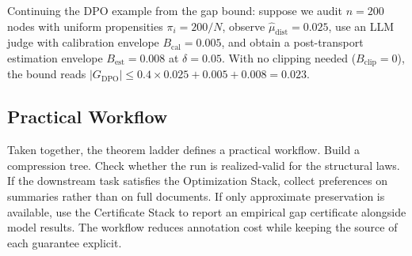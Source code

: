 Continuing the DPO example from the gap bound: suppose we audit $n = 200$ nodes with uniform propensities $\pi_i = 200/N$, observe $\hat{\mu}_{\mathrm{dist}} = 0.025$, use an LLM judge with calibration envelope $B_{\mathrm{cal}} = 0.005$, and obtain a post-transport estimation envelope $B_{\mathrm{est}} = 0.008$ at $\delta = 0.05$. With no clipping needed ($B_{\mathrm{clip}} = 0$), the bound reads $|G_{\mathrm{DPO}}| \le 0.4 \times 0.025 + 0.005 + 0.008 = 0.023$.

\subsection{Practical Workflow}

Taken together, the theorem ladder defines a practical workflow. Build a compression tree. Check whether the run is realized-valid for the structural laws. If the downstream task satisfies the Optimization Stack, collect preferences on summaries rather than on full documents. If only approximate preservation is available, use the Certificate Stack to report an empirical gap certificate alongside model results. The workflow reduces annotation cost while keeping the source of each guarantee explicit.
